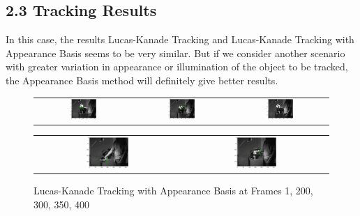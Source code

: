 \documentclass[a4paper]{article}
\begin{document}
\newpage
\subsection*{2.3 \hspace{4.5} Tracking Results}
In this case, the results Lucas-Kanade Tracking and Lucas-Kanade Tracking with Appearance Basis seems to be very similar. But if we consider another scenario with greater variation in appearance or illumination of the object to be tracked, the Appearance Basis method will definitely give better results.
\begin{figure}[!ht]
\centering
\begin{tabular}{ccc}
{\includegraphics[width=0.3\textwidth]{images/sylvseqrects_1}} &
{\includegraphics[width=0.3\textwidth]{images/sylvseqrects_200}} &
{\includegraphics[width=0.3\textwidth]{images/sylvseqrects_300}}
\end{tabular}
\begin{tabular}{cc}
{\includegraphics[width=0.3\textwidth]{images/sylvseqrects_350}} &
{\includegraphics[width=0.3\textwidth]{images/sylvseqrects_400}}
\end{tabular}
\caption{Lucas-Kanade Tracking with Appearance Basis at Frames 1, 200, 300, 350, 400}
\end{figure}
\end{document}
